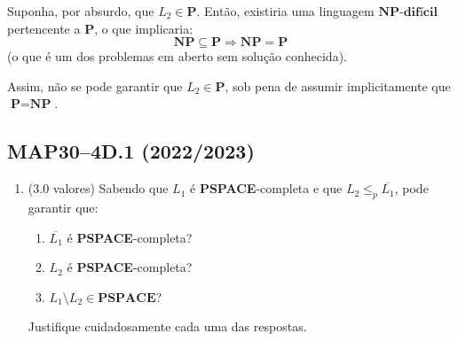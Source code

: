 \documentclass[a4paper,12pt]{article}
\begin{document}
\begin{enumerate}[label=\alph*)]
\begin{enumerate}[label=\roman*)]
    \vspace{0.3cm}
    Suponha, por absurdo, que $L_2 \in \textbf{P}$. Então, existiria uma linguagem $\textbf{NP-difícil}$ pertencente a $\textbf{P}$, o que implicaria:
    \[
    \textbf{NP} \subseteq \textbf{P} \Rightarrow \textbf{NP} = \textbf{P}
    \]
    (o que é um dos problemas em aberto sem solução conhecida).

    \vspace{0.3cm}
    Assim, não se pode garantir que $L_2 \in \textbf{P}$, sob pena de assumir implicitamente que $\textbf{P} = \textbf{NP}$.

  \end{enumerate}
\end{enumerate}

\vspace{1.0cm}
\subsection*{MAP30–4D.1 (2022/2023)}
\begin{enumerate}[label=\alph*)]
  \item (3.0 valores) Sabendo que \( L_1 \) é \textbf{PSPACE}-completa e que \( L_2 \leq_p \overline{L_1} \), pode garantir que:
  
  \begin{enumerate}[label=(\roman*)]
      \item \( \overline{L_1} \) é \textbf{PSPACE}-completa?
      \item \( L_2 \) é \textbf{PSPACE}-completa?
      \item \( L_1 \setminus L_2 \in \textbf{PSPACE} \)?
  \end{enumerate}
  
  Justifique cuidadosamente cada uma das respostas.
\end{enumerate}
\end{document}
